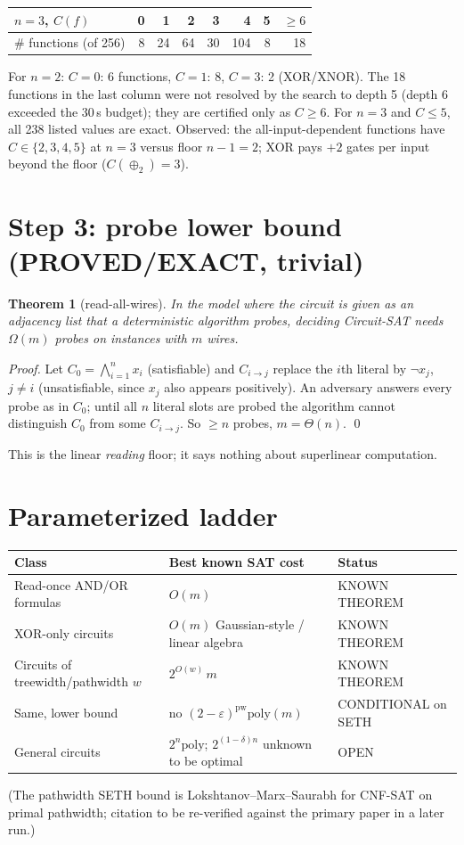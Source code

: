 \documentclass[11pt]{article}
\newtheorem{thm}{Theorem}\newtheorem{lem}[thm]{Lemma}
\begin{document}
\begin{center}\begin{tabular}{lrrrrrrr}\toprule
$n=3$, $C(f)$ & 0 & 1 & 2 & 3 & 4 & 5 & $\ge6$\\ \midrule
\# functions (of 256) & 8 & 24 & 64 & 30 & 104 & 8 & 18\\ \bottomrule\end{tabular}\end{center}
For $n=2$: $C=0$: 6 functions, $C=1$: 8, $C=3$: 2 (XOR/XNOR). The 18 functions in the last
column were not resolved by the search to depth 5 (depth 6 exceeded the 30\,s budget); they
are certified only as $C\ge 6$. For $n=3$ and $C\le5$, all 238 listed values are exact.
Observed: the all-input-dependent functions have $C\in\{2,3,4,5\}$ at $n=3$ versus floor
$n-1=2$; XOR pays $+2$ gates per input beyond the floor ($C(\oplus_2)=3$).

\section{Step 3: probe lower bound (PROVED/EXACT, trivial)}
\begin{thm}[read-all-wires]\label{thm:probe}
In the model where the circuit is given as an adjacency list that a deterministic
algorithm probes, deciding Circuit-SAT needs $\Omega(m)$ probes on instances with $m$ wires.
\end{thm}
\begin{proof} Let $C_0=\bigwedge_{i=1}^{n}x_i$ (satisfiable) and $C_{i\to j}$ replace the $i$th
literal by $\neg x_j$, $j\ne i$ (unsatisfiable, since $x_j$ also appears positively). An
adversary answers every probe as in $C_0$; until all $n$ literal slots are probed the algorithm
cannot distinguish $C_0$ from some $C_{i\to j}$. So $\ge n$ probes, $m=\Theta(n)$. \qed
\end{proof}
This is the linear \emph{reading} floor; it says nothing about superlinear computation.

\section{Parameterized ladder}
\begin{center}\begin{tabular}{p{4.2cm}p{4.5cm}p{4.2cm}}\toprule
Class & Best known SAT cost & Status\\ \midrule
Read-once AND/OR formulas & $O(m)$ & KNOWN THEOREM\\
XOR-only circuits & $O(m)$ Gaussian-style / linear algebra & KNOWN THEOREM\\
Circuits of treewidth/pathwidth $w$ & $2^{O(w)}\,m$ & KNOWN THEOREM\\
Same, lower bound & no $(2-\varepsilon)^{\mathrm{pw}}\mathrm{poly}(m)$ & CONDITIONAL on SETH\\
General circuits & $2^{n}\mathrm{poly}$; $2^{(1-\delta)n}$ unknown to be optimal & OPEN\\ \bottomrule
\end{tabular}\end{center}
(The pathwidth SETH bound is Lokshtanov--Marx--Saurabh for CNF-SAT on primal pathwidth;
citation to be re-verified against the primary paper in a later run.)
\end{document}
